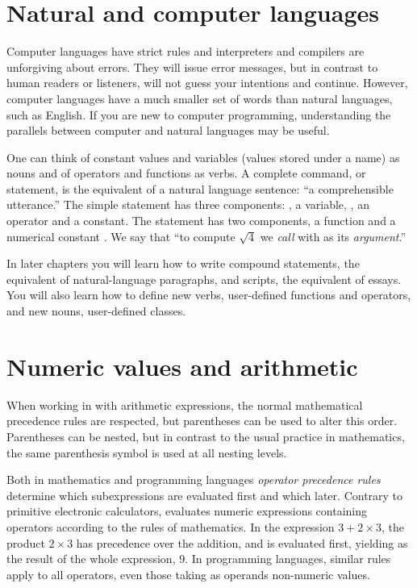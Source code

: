 \documentclass[krantz2]{krantz}\usepackage{knitr}
\begin{document}
\section{Natural and computer languages}
Computer languages have strict rules and interpreters and compilers are unforgiving about errors. They will issue error messages, but in contrast to human readers or listeners, will not guess your intentions and continue. However, computer languages have a much smaller set of words than natural languages, such as English. If you are new to computer programming, understanding the parallels between computer and natural languages may be useful.

One can think of constant values and variables (values stored under a name) as nouns and of operators and functions as verbs. A complete command, or statement, is the equivalent of a natural language sentence: ``a comprehensible utterance.'' The simple statement  has three components: , a variable, \code{+}, an operator and  a constant. The statement  has two components, a function  and a numerical constant . We say that ``to compute $\sqrt{4}$ we \emph{call}  with  as its \emph{argument}.''

In later chapters you will learn how to write compound statements, the equivalent of natural-language paragraphs, and scripts, the equivalent of essays. You will also learn how to define new verbs, user-defined functions and operators, and new nouns, user-defined classes.

\section{Numeric values and arithmetic}
\qRoperator{+}\qRoperator{-}\qRoperator{*}\qRoperator{/}
When working in \Rlang with arithmetic expressions, the normal mathematical precedence rules are respected, but parentheses can be used to alter this order. Parentheses can be nested, but in contrast to the usual practice in mathematics, the same parenthesis symbol is used at all nesting levels.

\begin{explainbox}
 Both in mathematics and programming languages \emph{operator precedence rules} determine which subexpressions are evaluated first and which later. Contrary to primitive electronic calculators, \Rlang evaluates numeric expressions containing operators according to the rules of mathematics. In the expression $3 + 2 \times 3$, the product $2 \times 3$ has precedence over the addition, and is evaluated first, yielding as the result of the whole expression, 9. In programming languages, similar rules apply to all operators, even those taking as operands non-numeric values.
\end{explainbox}
\end{document}
